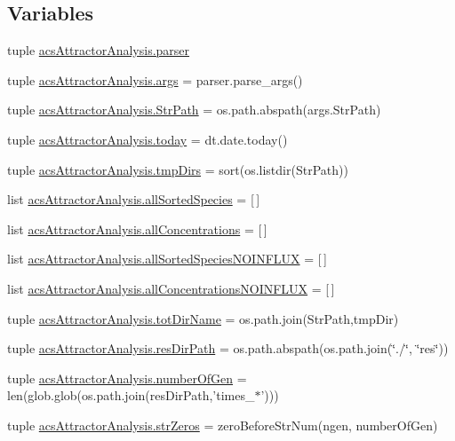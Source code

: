 \subsection*{Variables}
\begin{DoxyCompactItemize}
\item 
tuple \hyperlink{a00122_ab2b01a2d0224ace0cd720a6d807afd0b}{acs\-Attractor\-Analysis.\-parser}
\item 
tuple \hyperlink{a00122_a750e66218ca39f0949f2f92e89136e37}{acs\-Attractor\-Analysis.\-args} = parser.\-parse\-\_\-args()
\item 
tuple \hyperlink{a00122_a8941499f40259763765b64e3185be82c}{acs\-Attractor\-Analysis.\-Str\-Path} = os.\-path.\-abspath(args.\-Str\-Path)
\item 
tuple \hyperlink{a00122_a71bc5e3d205016fb7893b438e75be78e}{acs\-Attractor\-Analysis.\-today} = dt.\-date.\-today()
\item 
tuple \hyperlink{a00122_ac88c3245a42ebefee3fcf90626f6eaf4}{acs\-Attractor\-Analysis.\-tmp\-Dirs} = sort(os.\-listdir(Str\-Path))
\item 
list \hyperlink{a00122_aafc595063b7c4b74f94c0931ff2370a5}{acs\-Attractor\-Analysis.\-all\-Sorted\-Species} = \mbox{[}$\,$\mbox{]}
\item 
list \hyperlink{a00122_ae708f0b0e671f432735f039e1ff6b6ca}{acs\-Attractor\-Analysis.\-all\-Concentrations} = \mbox{[}$\,$\mbox{]}
\item 
list \hyperlink{a00122_a02a8db664a67956bc698b79f7c31a7bd}{acs\-Attractor\-Analysis.\-all\-Sorted\-Species\-N\-O\-I\-N\-F\-L\-U\-X} = \mbox{[}$\,$\mbox{]}
\item 
list \hyperlink{a00122_acda16f4751633455ab19e92bdc5baf2a}{acs\-Attractor\-Analysis.\-all\-Concentrations\-N\-O\-I\-N\-F\-L\-U\-X} = \mbox{[}$\,$\mbox{]}
\item 
tuple \hyperlink{a00122_ad3caf9c42727aaab24f4ea4dae362fc9}{acs\-Attractor\-Analysis.\-tot\-Dir\-Name} = os.\-path.\-join(Str\-Path,tmp\-Dir)
\item 
tuple \hyperlink{a00122_a35eb3b681c7408f1476b92798d4f2c16}{acs\-Attractor\-Analysis.\-res\-Dir\-Path} = os.\-path.\-abspath(os.\-path.\-join(\char`\"{}./\char`\"{}, \char`\"{}res\char`\"{}))
\item 
tuple \hyperlink{a00122_ac014a9b46a060e4fed96eaee9614345b}{acs\-Attractor\-Analysis.\-number\-Of\-Gen} = len(glob.\-glob(os.\-path.\-join(res\-Dir\-Path,'times\-\_\-$\ast$')))
\item 
tuple \hyperlink{a00122_a5708d1d44920d75a918ec1c988c02c57}{acs\-Attractor\-Analysis.\-str\-Zeros} = zero\-Before\-Str\-Num(ngen, number\-Of\-Gen)

\end{DoxyCompactItemize}
